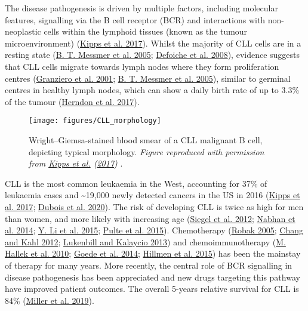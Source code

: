 \documentclass[11pt, a4paper, twosided]{book}
\begin{document}
The disease pathogenesis is driven by multiple factors, including molecular features, signalling via the B cell receptor (BCR) and interactions with non-neoplastic cells within the lymphoid tissues (known as the tumour microenvironment) (\protect\hyperlink{ref-Kipps2017}{Kipps et al. 2017}). Whilst the majority of CLL cells are in a resting state (\protect\hyperlink{ref-Messmer2005}{B. T. Messmer et al. 2005}; \protect\hyperlink{ref-Defoiche2008}{Defoiche et al. 2008}), evidence suggests that CLL cells migrate towards lymph nodes where they form proliferation centres (\protect\hyperlink{ref-Granziero2001}{Granziero et al. 2001}; \protect\hyperlink{ref-Messmer2005}{B. T. Messmer et al. 2005}), similar to germinal centres in healthy lymph nodes, which can show a daily birth rate of up to 3.3\% of the tumour (\protect\hyperlink{ref-Herndon2017}{Herndon et al. 2017}).


\begin{figure}

{\centering \texttt{[image: figures/CLL\_morphology]} 

}

\caption{Wright--Giemsa-stained blood smear of a CLL malignant B cell, depicting typical morphology. \emph{Figure reproduced with permission from \protect\hyperlink{ref-Kipps2017}{Kipps et al.} (\protect\hyperlink{ref-Kipps2017}{2017}) }.}\label{fig:CLLmorphology}
\end{figure}
CLL is the most common leukaemia in the West, accounting for 37\% of leukaemia cases and \textasciitilde19,000 newly detected cancers in the US in 2016 (\protect\hyperlink{ref-Kipps2017}{Kipps et al. 2017}; \protect\hyperlink{ref-Dubois2020}{Dubois et al. 2020}). The risk of developing CLL is twice as high for men than women, and more likely with increasing age (\protect\hyperlink{ref-Siegel2012}{Siegel et al. 2012}; \protect\hyperlink{ref-Nabhan2014}{Nabhan et al. 2014}; \protect\hyperlink{ref-Li2015}{Y. Li et al. 2015}; \protect\hyperlink{ref-Pulte2015}{Pulte et al. 2015}). Chemotherapy (\protect\hyperlink{ref-Robak2005}{Robak 2005}; \protect\hyperlink{ref-Chang2012}{Chang and Kahl 2012}; \protect\hyperlink{ref-Lukenbill2013}{Lukenbill and Kalaycio 2013}) and chemoimmunotherapy (\protect\hyperlink{ref-Hallek2010}{M. Hallek et al. 2010}; \protect\hyperlink{ref-Goede2014}{Goede et al. 2014}; \protect\hyperlink{ref-Hillmen2015}{Hillmen et al. 2015}) has been the mainstay of therapy for many years. More recently, the central role of BCR signalling in disease pathogenesis has been appreciated and new drugs targeting this pathway have improved patient outcomes. The overall 5-years relative survival for CLL is 84\% (\protect\hyperlink{ref-Miller2019}{Miller et al. 2019}).
\end{document}
